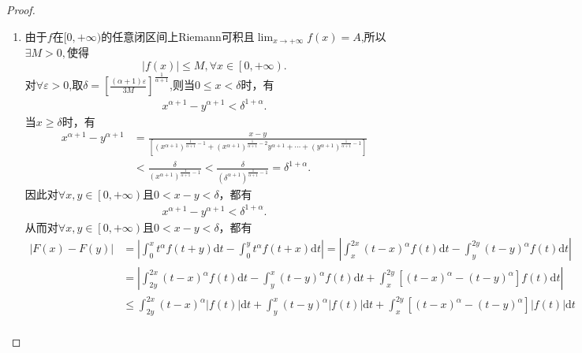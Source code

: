 \documentclass[../../main.tex]{subfiles}
\begin{document}
\begin{proof}
\begin{enumerate}[(1)]
\item 由于$f$在$[0,+\infty)$的任意闭区间上Riemann可积且$\lim_{x\rightarrow +\infty} f\left( x \right) =A$,所以
$\exists M>0,$使得$$
\left| f\left( x \right) \right|\leqslant M,\forall x\in \left[ 0,+\infty \right).
$$
对$\forall \varepsilon >0$,取$\delta = \left[ \frac{\left( \alpha +1 \right) \varepsilon}{3M} \right] ^{\frac{1}{\alpha +1}}$,则当\(0\leqslant x<\delta\)时，有
\begin{align*}
x^{\alpha +1}-y^{\alpha +1}<\delta ^{1+\alpha}.
\end{align*}
当\(x\geqslant \delta\)时，有
\begin{align*}
x^{\alpha +1}-y^{\alpha +1}&=\frac{x-y}{\left[ \left( x^{\alpha +1} \right) ^{\frac{1}{\alpha +1}-1}+\left( x^{\alpha +1} \right) ^{\frac{1}{\alpha +1}-2}y^{\alpha +1}+\cdots +\left( y^{\alpha +1} \right) ^{\frac{1}{\alpha +1}-1} \right]} \\
&<\frac{\delta}{\left( x^{\alpha +1} \right) ^{\frac{1}{\alpha +1}-1}}<\frac{\delta}{\left( \delta ^{\alpha +1} \right) ^{\frac{1}{\alpha +1}-1}}=\delta ^{1+\alpha}.
\end{align*}
因此对\(\forall x,y\in \left[ 0,+\infty \right)\)且\(0<x-y<\delta\)，都有
\begin{align*}
x^{\alpha +1}-y^{\alpha +1}<\delta ^{1+\alpha}.
\end{align*}
从而对\(\forall x,y\in \left[ 0,+\infty \right)\)且\(0<x-y<\delta\)，都有
\begin{align*}
\left| F\left( x \right) -F\left( y \right) \right|&=\left| \int_0^x{t^{\alpha}f\left( t+y \right) \mathrm{d}t}-\int_0^y{t^{\alpha}f\left( t+x \right) \mathrm{d}t} \right|=\left| \int_x^{2x}{\left( t-x \right) ^{\alpha}f\left( t \right) \mathrm{d}t}-\int_y^{2y}{\left( t-y \right) ^{\alpha}f\left( t \right) \mathrm{d}t} \right| \\
&=\left| \int_{2y}^{2x}{\left( t-x \right) ^{\alpha}f\left( t \right) \mathrm{d}t}-\int_y^x{\left( t-y \right) ^{\alpha}f\left( t \right) \mathrm{d}t}+\int_x^{2y}{\left[ \left( t-x \right) ^{\alpha}-\left( t-y \right) ^{\alpha} \right] f\left( t \right) \mathrm{d}t} \right| \\
&\leqslant \int_{2y}^{2x}{\left( t-x \right) ^{\alpha}\left| f\left( t \right) \right|\mathrm{d}t}+\int_y^x{\left( t-y \right) ^{\alpha}\left| f\left( t \right) \right|\mathrm{d}t}+\int_x^{2y}{\left[ \left( t-x \right) ^{\alpha}-\left( t-y \right) ^{\alpha} \right] \left| f\left( t \right) \right|\mathrm{d}t} \\

\end{align*}
\end{enumerate}
\end{proof}
\end{document}

